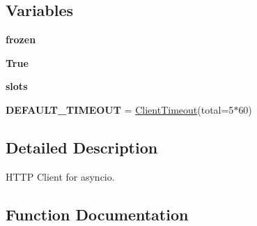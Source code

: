 \subsection*{Variables}
\begin{DoxyCompactItemize}
\item 
\mbox{\label{namespaceaiohttp_1_1client_ad581b3b167bb0890b7c121cc3f579f7d}} 
{\bfseries frozen}
\item 
\mbox{\label{namespaceaiohttp_1_1client_a90d6973ce7853fef04691d60eb176356}} 
{\bfseries True}
\item 
\mbox{\label{namespaceaiohttp_1_1client_aba5717f3d9d62ebdf08046173dee44b7}} 
{\bfseries slots}
\item 
\mbox{\label{namespaceaiohttp_1_1client_a88c1fd64213b45acd682fb67d539a202}} 
{\bfseries D\+E\+F\+A\+U\+L\+T\+\_\+\+T\+I\+M\+E\+O\+UT} = \hyperlink{classaiohttp_1_1client_1_1_client_timeout}{Client\+Timeout}(total=5$\ast$60)
\end{DoxyCompactItemize}


\subsection{Detailed Description}
\begin{DoxyVerb}HTTP Client for asyncio.\end{DoxyVerb}
 

\subsection{Function Documentation}
\mbox{\label{namespaceaiohttp_1_1client_ab0f1d0a5569ca9cc2986e7e43380c049}} 
